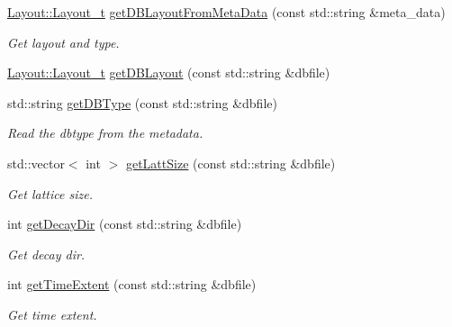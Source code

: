 \begin{DoxyCompactItemize}
\item 
\mbox{\hyperlink{structHadron_1_1Layout_1_1Layout__t}{Layout\+::\+Layout\+\_\+t}} \mbox{\hyperlink{namespaceHadron_a5f888183d0cbdadea2ebdf51020f5042}{get\+D\+B\+Layout\+From\+Meta\+Data}} (const std\+::string \&meta\+\_\+data)
\begin{DoxyCompactList}\small\item\em Get layout and type. \end{DoxyCompactList}\item 
\mbox{\hyperlink{structHadron_1_1Layout_1_1Layout__t}{Layout\+::\+Layout\+\_\+t}} \mbox{\hyperlink{namespaceHadron_af18d764aba83c32e26a22d75ed2dfbf7}{get\+D\+B\+Layout}} (const std\+::string \&dbfile)
\item 
std\+::string \mbox{\hyperlink{namespaceHadron_a82284ec1545a1a6b6794da8d973a1d57}{get\+D\+B\+Type}} (const std\+::string \&dbfile)
\begin{DoxyCompactList}\small\item\em Read the dbtype from the metadata. \end{DoxyCompactList}\item 
std\+::vector$<$ int $>$ \mbox{\hyperlink{namespaceHadron_aa639c858514f322eb7ee4c074924746a}{get\+Latt\+Size}} (const std\+::string \&dbfile)
\begin{DoxyCompactList}\small\item\em Get lattice size. \end{DoxyCompactList}\item 
int \mbox{\hyperlink{namespaceHadron_ae5c5e7cd57aa116ce56262bf00762610}{get\+Decay\+Dir}} (const std\+::string \&dbfile)
\begin{DoxyCompactList}\small\item\em Get decay dir. \end{DoxyCompactList}\item 
int \mbox{\hyperlink{namespaceHadron_a660c9f3adc1525c9d326b23398d09494}{get\+Time\+Extent}} (const std\+::string \&dbfile)
\begin{DoxyCompactList}\small\item\em Get time extent. \end{DoxyCompactList}\end{DoxyCompactItemize}
